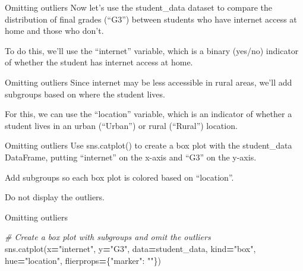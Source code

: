 \documentclass[
  ignorenonframetext,
]{beamer}
\newenvironment{Shaded}{\begin{snugshade}}{\end{snugshade}}
\newcommand{\CommentTok}[1]{\textcolor[rgb]{0.56,0.35,0.01}{\textit{#1}}}
\newcommand{\NormalTok}[1]{#1}
\newcommand{\OperatorTok}[1]{\textcolor[rgb]{0.81,0.36,0.00}{\textbf{#1}}}
\newcommand{\StringTok}[1]{\textcolor[rgb]{0.31,0.60,0.02}{#1}}
\begin{document}
\begin{frame}{Omitting outliers}
\label{omitting-outliers}
Now let's use the student\_data dataset to compare the distribution of
final grades (``G3'') between students who have internet access at home
and those who don't.

To do this, we'll use the ``internet'' variable, which is a binary
(yes/no) indicator of whether the student has internet access at home.
\end{frame}

\begin{frame}{Omitting outliers}
\label{omitting-outliers-1}
Since internet may be less accessible in rural areas, we'll add
subgroups based on where the student lives.

For this, we can use the ``location'' variable, which is an indicator of
whether a student lives in an urban (``Urban'') or rural (``Rural'')
location.
\end{frame}

\begin{frame}{Omitting outliers}
\label{omitting-outliers-2}
Use sns.catplot() to create a box plot with the student\_data DataFrame,
putting ``internet'' on the x-axis and ``G3'' on the y-axis.

Add subgroups so each box plot is colored based on ``location''.

Do not display the outliers.
\end{frame}

\begin{frame}[fragile]{Omitting outliers}
\label{omitting-outliers-3}

\begin{Shaded}
\begin{Highlighting}[]
\CommentTok{\# Create a box plot with subgroups and omit the outliers}
\NormalTok{sns.catplot(x}\OperatorTok{=}\StringTok{"internet"}\NormalTok{, y}\OperatorTok{=}\StringTok{"G3"}\NormalTok{,}
\NormalTok{            data}\OperatorTok{=}\NormalTok{student\_data,}
\NormalTok{            kind}\OperatorTok{=}\StringTok{"box"}\NormalTok{,}
\NormalTok{            hue}\OperatorTok{=}\StringTok{"location"}\NormalTok{,}
\NormalTok{            flierprops}\OperatorTok{=}\NormalTok{\{}\StringTok{"marker"}\NormalTok{: }\StringTok{""}\NormalTok{\})  }
\end{Highlighting}
\end{Shaded}
\end{frame}
\end{document}
